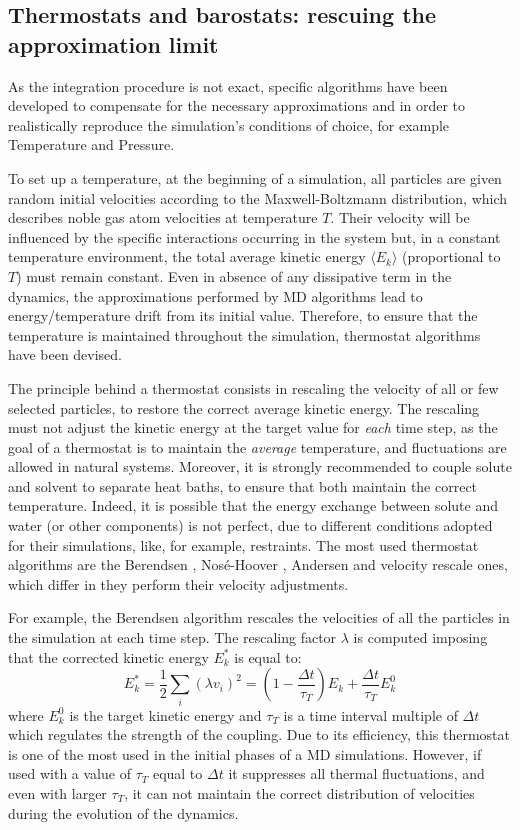 \documentclass[graybox]{svmult}
\begin{document}
\subsection{Thermostats and barostats: rescuing the approximation limit}
As the integration procedure is not exact, specific algorithms have been developed to compensate for the necessary approximations and in order to realistically reproduce the simulation's conditions of choice, for example Temperature and Pressure.

To set up a temperature, at the beginning of a simulation, all particles are given random initial velocities according to the Maxwell-Boltzmann distribution, which describes noble gas atom velocities at temperature $T$. Their velocity will be influenced by the specific interactions occurring in the system but, in a constant temperature environment, the total average kinetic energy $\langle E_k \rangle$ (proportional to $T$) must remain constant.
%
Even in absence of any dissipative term in the dynamics, the approximations performed by MD algorithms lead to energy/temperature drift from its initial value. Therefore, to ensure that the temperature is maintained throughout the simulation, thermostat algorithms have been devised.

The principle behind a thermostat consists in rescaling the velocity of all or few selected particles, to restore the correct average kinetic energy. The rescaling must not adjust the kinetic energy at the target value for \emph{each} time step, as the goal of a thermostat is to maintain the \emph{average} temperature, and fluctuations are allowed in natural systems.
%
Moreover, it is strongly recommended to couple solute and solvent to separate heat baths, to ensure that both maintain the correct temperature. Indeed, it is possible that the energy exchange between solute and water (or other components) is not perfect, due to different conditions adopted for their simulations, like, for example, restraints.
%
The most used thermostat algorithms are the Berendsen \cite{Berendsen1984}, Nos\'{e}-Hoover \cite{Nose1983,Hoover1985}, Andersen \cite{Andersen1980} and velocity rescale \cite{Bussi2007} ones, which differ in they perform their velocity adjustments.

For example, the Berendsen algorithm \citep{Berendsen1984} rescales the velocities of all the particles in the simulation at each time step. The rescaling factor $\lambda$ is computed imposing that the corrected kinetic energy $E^*_k$ is equal to:
\begin{equation} \label{eq:berend}
    E^*_k = \frac{1}{2} \sum_i \left(\lambda v_i\right)^2  = \left( 1 - \frac{\Delta t}{\tau_T} \right) E_k + \frac{\Delta t}{\tau_T} E_k^0
\end{equation}
where $E_k^0$ is the target kinetic energy and $\tau_T$ is a time interval multiple of $\Delta t$ which regulates the strength of the coupling.
%
Due to its efficiency, this thermostat is one of the most used in the initial phases of a MD simulations.
%
However, if used with a value of $\tau_T$ equal to $\Delta t$ it suppresses all thermal fluctuations, and even with larger $\tau_T$, it can not maintain the correct distribution of velocities during the evolution of the dynamics. 
\end{document}
